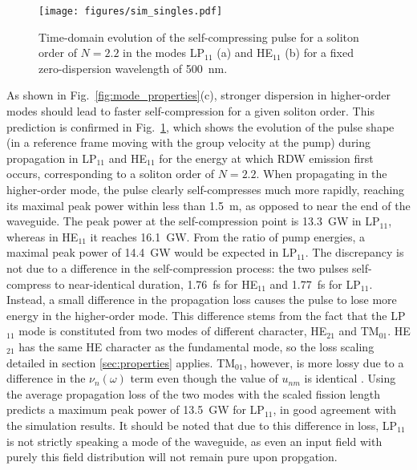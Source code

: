 \documentclass[amsmath, preprint, floatfix]{revtex4-2}
\begin{document}
\begin{figure}
    \centering
    \texttt{[image: figures/sim\_singles.pdf]}
    \caption{Time-domain evolution of the self-compressing pulse for a soliton order of $N=2.2$ in the modes LP$_{11}$ (a) and HE$_{11}$ (b) for a fixed zero-dispersion wavelength of \SI{500}{\nm}.}
    \label{fig:sim_singles}
\end{figure}

As shown in Fig.~\ref{fig:mode_properties}(c), stronger dispersion in higher-order modes should lead to faster self-compression for a given soliton order. This prediction is confirmed in Fig.~\ref{fig:sim_singles}, which shows the evolution of the pulse shape (in a reference frame moving with the group velocity at the pump) during propagation in LP$_{11}$ and HE$_{11}$ for the energy at which RDW emission first occurs, corresponding to a soliton order of $N=2.2$. When propagating in the higher-order mode, the pulse clearly self-compresses much more rapidly, reaching its maximal peak power within less than \SI{1.5}{\meter}, as opposed to near the end of the waveguide. The peak power at the self-compression point is \SI{13.3}{\giga\watt} in LP$_{11}$, whereas in HE$_{11}$ it reaches \SI{16.1}{\giga\watt}. From the ratio of pump energies, a maximal peak power of \SI{14.4}{\giga\watt} would be expected in LP$_{11}$. The discrepancy is not due to a difference in the self-compression process: the two pulses self-compress to near-identical duration, \SI{1.76}{\fs} for HE$_{11}$ and \SI{1.77}{\fs} for LP$_{11}$. Instead, a small difference in the propagation loss causes the pulse to lose more energy in the higher-order mode. This difference stems from the fact that the LP$_{11}$ mode is constituted from two modes of different character, HE$_{21}$ and TM$_{01}$. HE$_{21}$ has the same HE character as the fundamental mode, so the loss scaling detailed in section \ref{sec:properties} applies. TM$_{01}$, however, is more lossy due to a difference in the $\nu_n(\omega)$ term even though the value of $u_{nm}$ is identical \cite{marcatili_hollow_1964}. Using the average propagation loss of the two modes with the scaled fission length predicts a maximum peak power of \SI{13.5}{\giga\watt} for LP$_{11}$, in good agreement with the simulation results. It should be noted that due to this difference in loss, LP$_{11}$ is not strictly speaking a mode of the waveguide, as even an input field with purely this field distribution will not remain pure upon propgation.
\end{document}

